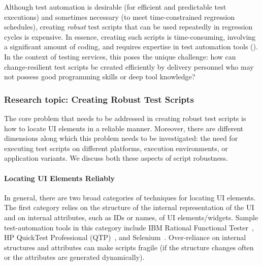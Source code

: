 Although test automation is desirable (\eg for efficient and predictable test
executions) and sometimes necessary (\eg to meet time-constrained regression
schedules), creating \textit{robust} test scripts that can be used repeatedly in
regression cycles is expensive. In essence, creating such scripts is
time-consuming, involving a significant amount of coding, and requires expertise
in test automation tools (\eg \cite{hpqtp,ibmrft,selenium}). In the context of
testing services, this poses the unique challenge: how can change-resilient test
scripts be created efficiently by delivery personnel who may not possess good
programming skills or deep tool knowledge? 


\subsubsection*{Research topic: Creating Robust Test Scripts}

The core problem that needs to be addressed in creating robust test scripts is
how to locate UI elements in a reliable manner. Moreover, there are different
dimensions along which this problem needs to be investigated: the need for
executing test scripts on different platforms, execution environments, or
application variants. We discuss both these aspects of script robustness.

\vskip -5pt
\paragraph*{Locating UI Elements Reliably} In general, there are two broad categories of
techniques for locating UI elements. The first category relies on the structure
of the internal representation of the UI
and on internal attributes, such as IDs or names, of UI elements/widgets. Sample
test-automation tools in this category include IBM Rational Functional
Tester~\cite{ibmrft}, HP QuickTest Professional (QTP)~\cite{hpqtp}, and
Selenium~\cite{selenium}. Over-reliance on internal structures and attributes
can make scripts fragile (\eg if the structure changes often or the attributes
are generated dynamically).

